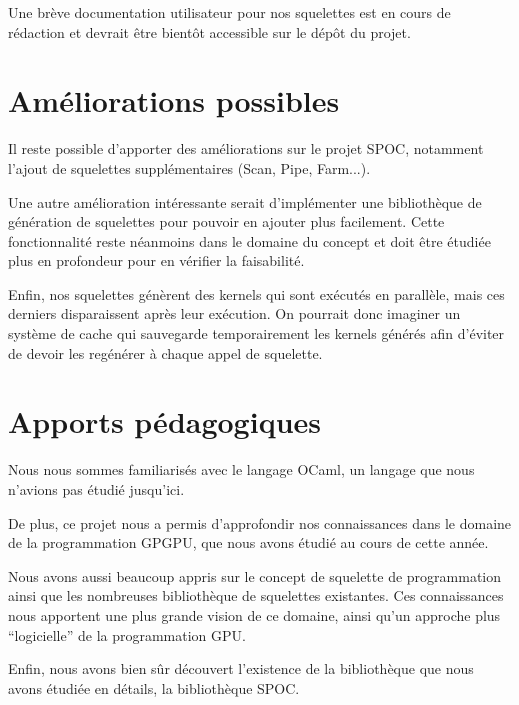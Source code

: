 \documentclass{report}
\begin{document}
Une brève documentation utilisateur pour nos squelettes est en cours de rédaction et devrait être bientôt accessible sur le dépôt du projet.\newline

\section{Améliorations possibles}
Il reste possible d'apporter des améliorations sur le projet SPOC, notamment l'ajout de squelettes supplémentaires (Scan, Pipe, Farm...).\newline

Une autre amélioration intéressante serait d'implémenter une bibliothèque de génération de squelettes pour pouvoir en ajouter plus facilement. Cette fonctionnalité reste néanmoins dans le domaine du concept et doit être étudiée plus en profondeur pour en vérifier la faisabilité.\newline

Enfin, nos squelettes génèrent des kernels qui sont exécutés en parallèle, mais ces derniers disparaissent après leur exécution. On pourrait donc imaginer un système de cache qui sauvegarde temporairement les kernels générés afin d'éviter de devoir les regénérer à chaque appel de squelette.\newline

\section{Apports pédagogiques}
Nous nous sommes familiarisés avec le langage OCaml, un langage que nous n'avions pas étudié jusqu'ici.\newline

De plus, ce projet nous a permis d'approfondir nos connaissances dans le domaine de la programmation GPGPU, que nous avons étudié au cours de cette année. \newline

Nous avons aussi beaucoup appris sur le concept de squelette de programmation ainsi que les nombreuses bibliothèque de squelettes existantes. Ces connaissances nous apportent une plus grande vision de ce domaine, ainsi qu'un approche plus ``logicielle'' de la programmation GPU.\newline

Enfin, nous avons bien sûr découvert l'existence de la bibliothèque que nous avons étudiée en détails, la bibliothèque SPOC.



\end{document}
